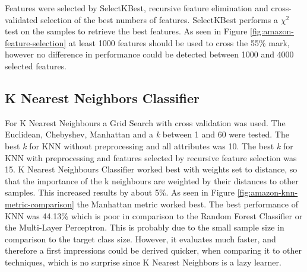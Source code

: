 Features were selected by SelectKBest, recursive feature elimination and cross-validated selection of the best numbers of features.
SelectKBest performs a ${\chi}^2$ test on the samples to retrieve the best features.
As seen in Figure \ref{fig:amazon-feature-selection} at least 1000 features should be used to cross the 55\% mark, however no difference in performance could be detected between 1000 and 4000 selected features.



\subsection{K Nearest Neighbors Classifier}

For K Nearest Neighbours a Grid Search with cross validation was used. The Euclidean, Chebyshev, Manhattan and a \textit{k} between 1 and 60 were tested. 
The best \textit{k} for KNN without preprocessing and all attributes was 10.
The best \textit{k} for KNN with preprocessing and features selected by recursive feature selection was 15.
K Nearest Neighbours Classifier worked best with weights set to distance, so that the importance of the k neighbours are weighted by their distances to other samples.
This increased results by about 5\%. As seen in Figure \ref{fig:amazon-knn-metric-comparison} the Manhattan metric worked best.
The best performance of KNN was 44.13\% which is poor in comparison to the Random Forest Classifier or the Multi-Layer Perceptron.
This is probably due to the small sample size in comparison to the target class size.
However, it evaluates much faster, and therefore a first impressions could be derived quicker, when comparing it to other techniques, which is no surprise since K Nearest Neighbors is a lazy learner.


